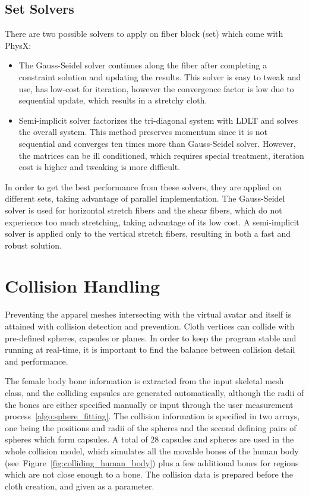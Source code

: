 \subsection{Set Solvers}
There are two possible solvers to apply on fiber block (set) which come with PhysX:
\begin{itemize}
\item The Gauss-Seidel solver continues along the fiber after completing a constraint solution and updating the results. This solver is easy to tweak and use, has low-cost for iteration, however the convergence factor is low due to sequential update, which results in a stretchy cloth.
\item Semi-implicit solver factorizes the tri-diagonal system with LDLT and solves the overall system. This method preserves momentum since it is not sequential and converges ten times more than Gauss-Seidel solver. However, the matrices can be ill conditioned, which requires special treatment, iteration cost is higher and tweaking is more difficult.
\end{itemize}

In order to get the best performance from these solvers, they are applied on different sets, taking advantage of parallel implementation. The Gauss-Seidel solver is used for horizontal stretch fibers and the shear fibers, which do not experience too much stretching, taking advantage of its low cost. A semi-implicit solver is applied only to the vertical stretch fibers, resulting in both a fast and robust solution.

\section{Collision Handling}
\label{section_collision}

Preventing the apparel meshes intersecting with the virtual avatar and itself is attained with collision detection and prevention. Cloth vertices can collide with pre-defined spheres, capsules or planes. In order to keep the program stable and running at real-time, it is important to find the balance between collision detail and performance. 

The female body bone information is extracted from the input skeletal mesh class, and the colliding capsules are generated automatically, although the radii of the bones are either specified manually or input through the user measurement process~\ref{algo:sphere_fitting}. The collision information is specified in two arrays, one being the positions and radii of the spheres and the second defining pairs of spheres which form capsules. A total of 28 capsules and spheres are used in the whole collision model, which simulates all the movable bones of the human body (see~Figure~\ref{fig:colliding_human_body}) plus a few additional bones for regions which are not close enough to a bone.  The collision data is prepared before the cloth creation, and given as a parameter. 

